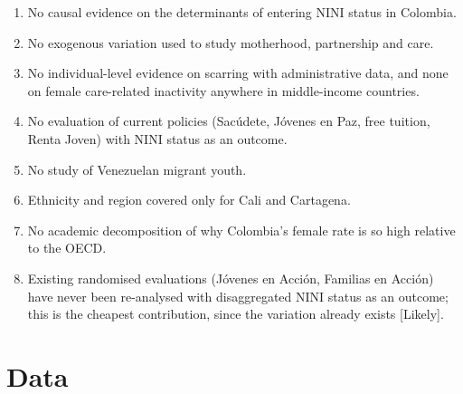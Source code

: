 \documentclass[11pt]{article}
\newcommand{\likely}{\textcolor{orange!80!black}{\textsf{\footnotesize[Likely]}}}
\begin{document}
\begin{enumerate}
\item No causal evidence on the determinants of entering NINI status in Colombia.
\item No exogenous variation used to study motherhood, partnership and care.
\item No individual-level evidence on scarring with administrative data, and none on female care-related inactivity anywhere in middle-income countries.
\item No evaluation of current policies (Sac\'udete, J\'ovenes en Paz, free tuition, Renta Joven) with NINI status as an outcome.
\item No study of Venezuelan migrant youth.
\item Ethnicity and region covered only for Cali and Cartagena.
\item No academic decomposition of why Colombia's female rate is so high relative to the OECD.
\item Existing randomised evaluations (J\'ovenes en Acci\'on, Familias en Acci\'on) have never been re-analysed with disaggregated NINI status as an outcome; this is the cheapest contribution, since the variation already exists \likely.
\end{enumerate}

\section{Data}\label{sec:data}
\end{document}

